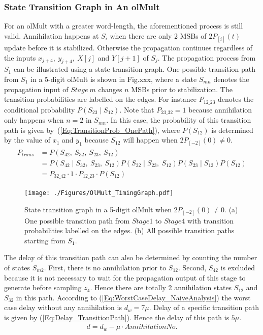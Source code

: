 \documentclass[a4paper, 11pt]{article}
\begin{document}
\subsubsection{State Transition Graph in An olMult}
For an olMult with a greater word-length, the aforementioned process is still valid. Annihilation happens at $S_i$ when there are only 2 MSBs of $2P_{[i]}(t)$ update before it is stabilized. Otherwise the propagation continues regardless of the inputs $x_{j+4},~y_{j+4},~X[j]$ and $Y[j+1]$ of $S_j$. The propagation process from $S_1$ can be illustrated using a state transition graph. One possible transition path from $S_1$ in a 5-digit olMult is shown in Fig.xxx, where a state $S_{mn}$ denotes the propagation input of $Stage~m$ changes $n$ MSBs prior to stabilization. The transition probabilities are labelled on the edges. For instance $P_{12\_23}$ denotes the conditional probability $P(S_{23}\mid S_{12})$. Note that $P_{23\_32}=1$ because annihilation only happens when $n=2$ in $S_{mn}$. In this case, the probability of this transition path is given by~(\ref{Eq:TransitionProb_OnePath}), where $P(S_{12})$ is determined by the value of $x_1$ and $y_1$ because $S_{12}$ will happen when $2P_{[-2]}(0)\neq0$.
\begin{eqnarray}\label{Eq:TransitionProb_OnePath}
\begin{split}
  P_{trans} &= P(S_{42},~S_{32},~S_{23},~S_{12})\\
            &= P(S_{42}\mid S_{32},~S_{23},~S_{12})P(S_{32}\mid S_{23},~S_{12})P(S_{23}\mid S_{12})P(S_{12})\\
            &= P_{32\_42}\cdot1\cdot P_{12\_23}\cdot P(S_{12}) 
\end{split}
\end{eqnarray}

\begin{figure}[tbp]\label{Fig:StateTransGraph}
  \centering
  \texttt{[image: ./Figures/OlMult\_TimingGraph.pdf]}
  \caption{State transition graph in a 5-digit olMult when $2P_{[-2]}(0)\neq0$. (a) One possible transition path from $Stage1$ to $Stage4$ with transition probabilities labelled on the edges. (b) All possible transition paths starting from $S_1$.}
\end{figure}

The delay of this transition path can also be determined by counting the number of states $S_{m2}$. First, there is no annihilation prior to $S_{12}$. Second, $S_{42}$ is excluded because it is not necessary to wait for the propagation output of this stage to generate before sampling $z_4$. Hence there are totally 2 annihilation states $S_{12}$ and $S_{32}$ in this path. According to (\ref{Eq:WorstCaseDelay_NaiveAnalysis}) the worst case delay without any annihilation is $d_w=7\mu$. Delay of a specific transition path is given by (\ref{Eq:Delay_TransitionPath}). Hence the delay of this path is $5\mu$.
%
\begin{eqnarray}\label{Eq:Delay_TransitionPath}
  d = d_w - \mu\cdot AnnihilationNo.  
\end{eqnarray}
\end{document}
